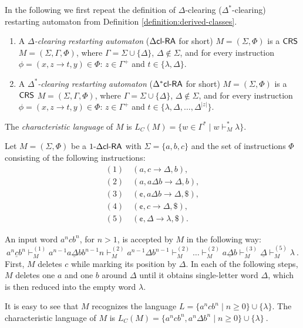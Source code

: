 \begin{definition}[\cite{CM10}]
In the following we first repeat the definition of $\Delta$-clearing ($\Delta^*$-clearing) restarting automaton from Definition \ref{definition:derived-classes}.
\begin{enumerate}
\item\label{definition:dxclra_dclra} A \emph{$\Delta$-clearing restarting automaton}  (\index{$\DclRA$}\emph{$\DclRA$} for short) $M = (\Sigma, \Phi)$ is a $\CRS$ $M = (\Sigma, \Gamma, \Phi)$, where $\Gamma = \Sigma \cup \{\Delta\}$, $\Delta \notin \Sigma$, and for every instruction $\phi = (x, z \to t, y) \in \Phi$: $z \in \Gamma^+$ and $t \in \{\lambda, \Delta\}$.
\item\label{definition:dxclra_dxclra} A \emph{$\Delta^*$-clearing restarting automaton} (\index{$\DXclRA$}\emph{$\DXclRA$} for short) $M = (\Sigma, \Phi)$ is a $\CRS$ $M = (\Sigma, \Gamma, \Phi)$, where $\Gamma = \Sigma \cup \{\Delta\}$, $\Delta \notin \Sigma$, and for every instruction $\phi = (x, z \to t, y) \in \Phi$: $z \in \Gamma^+$ and $t \in \{\lambda, \Delta, \ldots, \Delta^{|z|}\}$.
\end{enumerate}
The \emph{characteristic language} of $M$ is $L_C(M) = \{ w \in \Gamma^* \mid w \vdash_M^* \lambda \}$.
\end{definition}

\begin{example}\label{example:dxclra_a^n_c_b^n}
Let $M = (\Sigma, \Phi)$ be a $\kDclRA[1]$ with $\Sigma = \{a, b, c\}$ and the set of instructions $\Phi$ consisting of the following instructions:
$$
\begin{array}{l}
(1) \quad (a, c \to \Delta, b),\\
(2) \quad (a, a\Delta b \to \Delta, b),\\
(3) \quad (\cent, a \Delta b \to \Delta, \$),\\
(4) \quad (\cent, c \to \Delta, \$),\\
(5) \quad (\cent, \Delta \to \lambda, \$).
\end{array}
$$

An input word $a^n c b^n$, for $n > 1$, is accepted by $M$ in the following way:
$$
a^n\underline{c}b^n \vdash_M^{(1)} a^{n-1}\underline{a \Delta b} b^{n-1}n
\vdash_M^{(2)} a^{n-1} \Delta b^{n-1} \vdash_M^{(2)} \ldots
\vdash_M^{(2)} \underline{a \Delta b}
\vdash_M^{(3)} \underline{\Delta}
\vdash_M^{(5)} \lambda\ .
$$
First, $M$ deletes $c$ while marking its position by $\Delta$. In each of the following steps, $M$ deletes one $a$ and one $b$ around $\Delta$ until it obtains single-letter word $\Delta$, which is then reduced into the empty word $\lambda$.

It is easy to see that $M$ recognizes the language $L = \{a^ncb^n \mid n\ge 0\} \cup \{\lambda\}$. The characteristic language of $M$ is $L_C(M) = \{a^ncb^n,a^n \Delta b^n \mid n \ge 0 \} \cup\{\lambda\}\ $.
\end{example}

